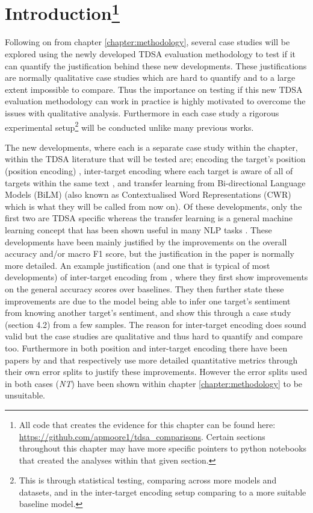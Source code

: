 \section[Introduction]{Introduction\footnote{All code that creates the evidence for this chapter can be found here: \url{https://github.com/apmoore1/tdsa_comparisons}. Certain sections throughout this chapter may have more specific pointers to python notebooks that created the analyses within that given section.}}
\label{section_case_intro}
Following on from chapter \ref{chapter:methodology}, several case studies will be explored using the newly developed TDSA evaluation methodology to test if it can quantify the justification behind these new developments. These justifications are normally qualitative case studies which are hard to quantify and to a large extent impossible to compare. Thus the importance on testing if this new TDSA evaluation methodology can work in practice is highly motivated to overcome the issues with qualitative analysis. Furthermore in each case study a rigorous experimental setup\footnote{This is through statistical testing, comparing across more models and datasets, and in the inter-target encoding setup comparing to a more suitable baseline model.} will be conducted unlike many previous works.

The new developments, where each is a separate case study within the chapter, within the TDSA literature that will be tested are; encoding the target's position (position encoding) \citep{gu-etal-2018-position}, inter-target encoding where each target is aware of all of targets within the same text \citep{hazarika-etal-2018-modeling}, and transfer learning from Bi-directional Language Models (BiLM) \citep{sun-etal-2019-utilizing,xu-etal-2019-bert} (also known as Contextualised Word Representations (CWR) which is what they will be called from now on). Of these developments, only the first two are TDSA specific whereas the transfer learning is a general machine learning concept that has been shown useful in many NLP tasks \citep{peters-etal-2018-deep}. These developments have been mainly justified by the improvements on the overall accuracy and/or macro F1 score, but the justification in the paper is normally more detailed. An example justification (and one that is typical of most developments) of inter-target encoding from \citet{hazarika-etal-2018-modeling}, where they first show improvements on the general accuracy scores over baselines. They then further state these improvements are due to the model being able to infer one target's sentiment from knowing another target's sentiment, and show this through a case study (section 4.2) from a few samples. The reason for inter-target encoding does sound valid but the case studies are qualitative and thus hard to quantify and compare too. Furthermore in both position and inter-target encoding there have been papers by \citet{he-etal-2018-exploiting} and \citet{majumder-etal-2018-iarm} that respectively use more detailed quantitative metrics through their own error splits to justify these improvements. However the error splits used in both cases (\textit{NT}) have been shown within chapter \ref{chapter:methodology} to be unsuitable.

